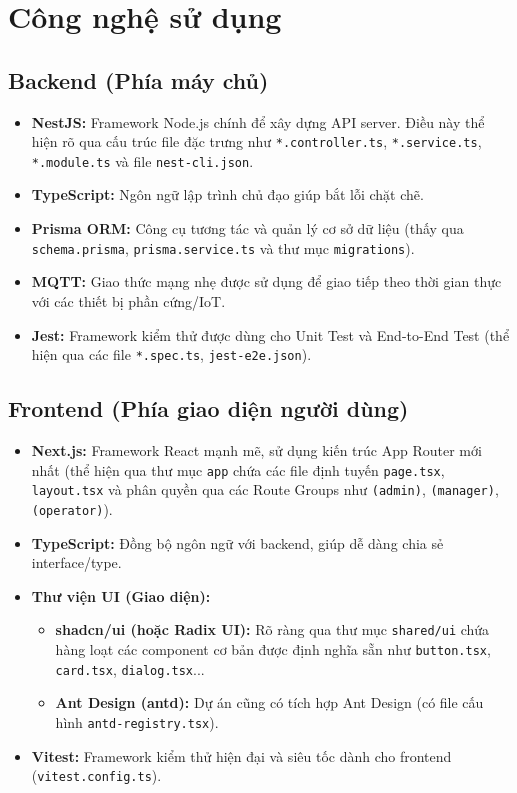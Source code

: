 \section{Công nghệ sử dụng}
\subsection{Backend (Phía máy chủ)}
\begin{itemize}
    \item \textbf{NestJS:} Framework Node.js chính để xây dựng API server. Điều này thể hiện rõ qua cấu trúc file đặc trưng như \texttt{*.controller.ts}, \texttt{*.service.ts}, \texttt{*.module.ts} và file \texttt{nest-cli.json}.
    \item \textbf{TypeScript:} Ngôn ngữ lập trình chủ đạo giúp bắt lỗi chặt chẽ.
    \item \textbf{Prisma ORM:} Công cụ tương tác và quản lý cơ sở dữ liệu (thấy qua \texttt{schema.prisma}, \texttt{prisma.service.ts} và thư mục \texttt{migrations}).
    \item \textbf{MQTT:} Giao thức mạng nhẹ được sử dụng để giao tiếp theo thời gian thực với các thiết bị phần cứng/IoT.
    \item \textbf{Jest:} Framework kiểm thử được dùng cho Unit Test và End-to-End Test (thể hiện qua các file \texttt{*.spec.ts}, \texttt{jest-e2e.json}).
\end{itemize}

\subsection{Frontend (Phía giao diện người dùng)}
\begin{itemize}
    \item \textbf{Next.js:} Framework React mạnh mẽ, sử dụng kiến trúc App Router mới nhất (thể hiện qua thư mục \texttt{app} chứa các file định tuyến \texttt{page.tsx}, \texttt{layout.tsx} và phân quyền qua các Route Groups như \texttt{(admin)}, \texttt{(manager)}, \texttt{(operator)}).
    \item \textbf{TypeScript:} Đồng bộ ngôn ngữ với backend, giúp dễ dàng chia sẻ interface/type.
    \item \textbf{Thư viện UI (Giao diện):}
    \begin{itemize}
        \item \textbf{shadcn/ui (hoặc Radix UI):} Rõ ràng qua thư mục \texttt{shared/ui} chứa hàng loạt các component cơ bản được định nghĩa sẵn như \texttt{button.tsx}, \texttt{card.tsx}, \texttt{dialog.tsx}...
        \item \textbf{Ant Design (antd):} Dự án cũng có tích hợp Ant Design (có file cấu hình \texttt{antd-registry.tsx}).
    \end{itemize}
    \item \textbf{Vitest:} Framework kiểm thử hiện đại và siêu tốc dành cho frontend (\texttt{vitest.config.ts}).
\end{itemize}

